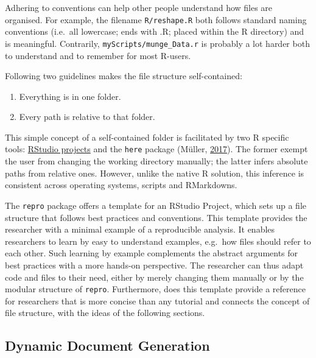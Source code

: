\documentclass[12pt,a4paper,twoside]{article}
\providecommand{\tightlist}{%
  \setlength{\itemsep}{0pt}\setlength{\parskip}{0pt}}
\begin{document}
Adhering to conventions can help other people understand how files are organised.
For example, the filename \texttt{R/reshape.R} both follows standard naming conventions (i.e.~all lowercase; ends with .R; placed within the R directory) and is meaningful. Contrarily, \texttt{myScripts/munge\_Data.r} is probably a lot harder both to understand and to remember for most R-users.

Following two guidelines makes the file structure self-contained:

\begin{enumerate}
\def\labelenumi{\arabic{enumi}.}
\tightlist
\item
  Everything is in one folder.
\item
  Every path is relative to that folder.
\end{enumerate}

This simple concept of a self-contained folder is facilitated by two R specific tools: \href{https://r4ds.had.co.nz/workflow-projects.html}{RStudio projects} and the \texttt{here} package (Müller, \protect\hyperlink{ref-R-here}{2017}).
The former exempt the user from changing the working directory manually; the latter infers absolute paths from relative ones.
However, unlike the native R solution, this inference is consistent across operating systems, scripts and RMarkdowns.

The \texttt{repro} package offers a template for an RStudio Project, which sets up a file structure that follows best practices and conventions.
This template provides the researcher with a minimal example of a reproducible analysis.
It enables researchers to learn by easy to understand examples, e.g.~how files should refer to each other.
Such learning by example complements the abstract arguments for best practices with a more hands-on perspective.
The researcher can thus adapt code and files to their need, either by merely changing them manually or by the modular structure of \texttt{repro}.
Furthermore, does this template provide a reference for researchers that is more concise than any tutorial and connects the concept of file structure, with the ideas of the following sections.

\hypertarget{dynamic-document-generation}{%
\subsection{Dynamic Document Generation}\label{dynamic-document-generation}}
\end{document}
